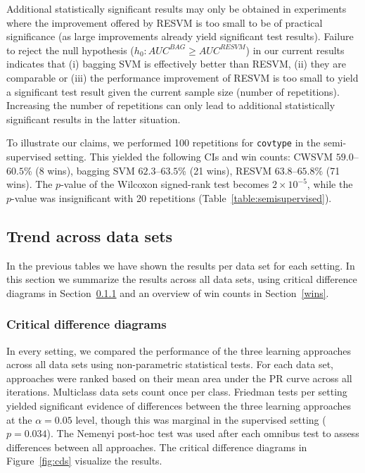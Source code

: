 \documentclass[preprint,elsarticle-num,12pt]{elsarticle}
\begin{document}
Additional statistically significant results may only be obtained in experiments where the improvement offered by RESVM is too small to be of practical significance (as large improvements already yield significant test results). Failure to reject the null hypothesis ($h_0: AUC^{BAG} \geq AUC^{RESVM}$) in our current results indicates that (i) bagging SVM is effectively better than RESVM, (ii) they are comparable or (iii) the performance improvement of RESVM is too small to yield a significant test result given the current sample size (number of repetitions). Increasing the number of repetitions can only lead to additional statistically significant results in the latter situation. 

To illustrate our claims, we performed 100 repetitions for \texttt{covtype} in the semi-supervised setting. This yielded the following CIs and win counts: CWSVM $59.0$--$60.5$\% (8 wins), bagging SVM $62.3$--$63.5$\% (21 wins), RESVM $63.8$--$65.8\%$ (71 wins). The $p$-value of the Wilcoxon signed-rank test becomes $2\times 10^{-5}$, while the $p$-value was insignificant with 20 repetitions (Table~\ref{table:semisupervised}).

\subsection{Trend across data sets}
In the previous tables we have shown the results per data set for each setting. In this section we summarize the results across all data sets, using critical difference diagrams \citep{demvsar2006statistical} in Section~\ref{cds} and an overview of win counts in Section~\ref{wins}.

\subsubsection{Critical difference diagrams} \label{cds}
In every setting, we compared the performance of the three learning approaches across all data sets using non-parametric statistical tests. For each data set, approaches were ranked based on their mean area under the PR curve across all iterations. Multiclass data sets count once per class. Friedman tests per setting yielded significant evidence of differences between the three learning approaches at the $\alpha=0.05$ level, though this was marginal in the supervised setting ($p=0.034$). The Nemenyi post-hoc test \citep{nemenyi1962distribution} was used after each omnibus test to assess differences between all approaches. The critical difference diagrams in Figure~\ref{fig:cds} visualize the results.
\end{document}
